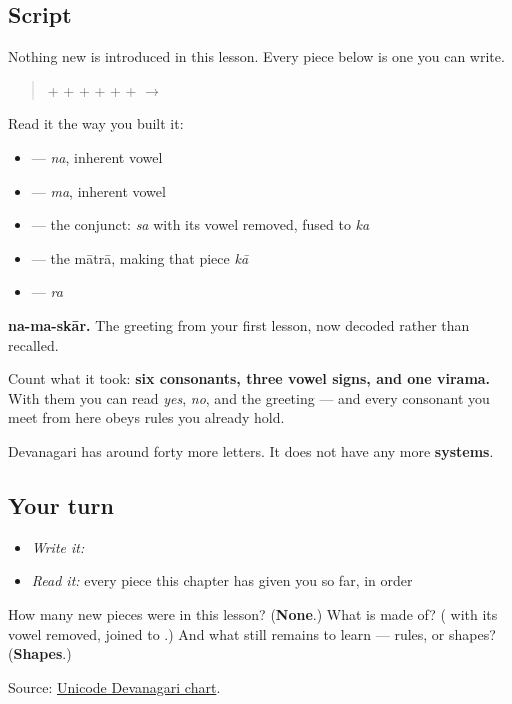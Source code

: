 \subsection*{Script}
Nothing new is introduced in this lesson. Every piece below is one you can write.

\begin{quote}
\textbf{} + \textbf{} + \textbf{} + \textbf{} + \textbf{} + \textbf{} + \textbf{} $\to$ \textbf{}
\end{quote}

Read it the way you built it:

\begin{itemize}
\raggedright
  \item \textbf{} — \emph{na}, inherent vowel
  \item \textbf{} — \emph{ma}, inherent vowel
  \item \textbf{} — the conjunct: \emph{sa} with its vowel removed, fused to \emph{ka}
  \item \textbf{} — the mātrā, making that piece \emph{kā}
  \item \textbf{} — \emph{ra}
\end{itemize}

\textbf{na-ma-skār.} The greeting from your first lesson, now decoded rather than recalled.

Count what it took: \textbf{six consonants, three vowel signs, and one virama.} With them you can read \emph{yes}, \emph{no}, and the greeting — and every consonant you meet from here obeys rules you already hold.

Devanagari has around forty more letters. It does not have any more \textbf{systems}.

\subsection*{Your turn}
\begin{itemize}
\raggedright
  \item \emph{Write it:} 
  \item \emph{Read it:} every piece this chapter has given you so far, in order
\end{itemize}

\begin{tcolorbox}[breakable,colback=teal!4,colframe=teal!35!black,title={Before you move on}]
How many new pieces were in this lesson? (\textbf{None}.) What is \textbf{} made of? (\emph{\textbf{}} with its vowel removed, joined to \emph{\textbf{}}.) And what still remains to learn — rules, or shapes? (\textbf{Shapes}.)

Source: \href{https://www.unicode.org/charts/PDF/U0900.pdf}{Unicode Devanagari chart}.
\end{tcolorbox}
